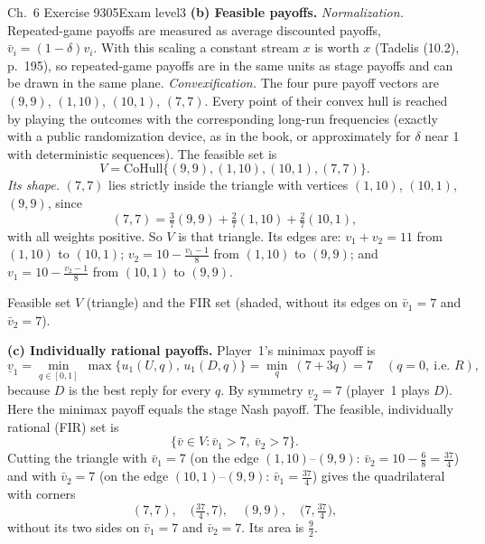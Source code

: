 \begin{exsol}{\MG{} Ch.~6 Exercise 9}{305}{Exam level}{3}
\textbf{(b) Feasible payoffs.} \emph{Normalization.} Repeated-game payoffs are measured as
average discounted payoffs, $\bar v_i = (1-\delta)v_i$. With this scaling a constant stream $x$ is
worth $x$ (Tadelis (10.2), p.~195), so repeated-game payoffs are in the same units as stage payoffs
and can be drawn in the same plane. \emph{Convexification.} The four pure payoff vectors are
$(9,9)$, $(1,10)$, $(10,1)$, $(7,7)$. Every point of their convex hull is reached by playing the
outcomes with the corresponding long-run frequencies (exactly with a public randomization device, as
in the book, or approximately for $\delta$ near 1 with deterministic sequences). The feasible set is
\[
  V = \mathrm{CoHull}\{(9,9), (1,10), (10,1), (7,7)\}.
\]
\emph{Its shape.} $(7,7)$ lies strictly inside the triangle with vertices $(1,10)$, $(10,1)$,
$(9,9)$, since
\[
  (7,7) = \tfrac37(9,9) + \tfrac27(1,10) + \tfrac27(10,1),
\]
with all weights positive. So $V$ is that triangle. Its edges are: $v_1 + v_2 = 11$ from $(1,10)$ to
$(10,1)$; $v_2 = 10 - \frac{v_1 - 1}{8}$ from $(1,10)$ to $(9,9)$; and $v_1 = 10 - \frac{v_2-1}{8}$
from $(10,1)$ to $(9,9)$.
\begin{center}
\end{center}
\vspace{-4pt}\centerline{\small Feasible set $V$ (triangle) and the FIR set (shaded, without its
edges on $\bar v_1 = 7$ and $\bar v_2 = 7$).}

\textbf{(c) Individually rational payoffs.} Player~1's minimax payoff is
\[
  \underline v_1 = \min_{q\in[0,1]}\ \max\{u_1(U,q),\, u_1(D,q)\}
  = \min_{q}\ (7 + 3q) = 7 \quad (q = 0,\ \text{i.e.\ } R),
\]
because $D$ is the best reply for every $q$. By symmetry $\underline v_2 = 7$ (player~1 plays $D$).
Here the minimax payoff equals the stage Nash payoff. The feasible, individually rational (FIR) set is
\[
  \{\bar v \in V : \bar v_1 > 7,\ \bar v_2 > 7\}.
\]
Cutting the triangle with $\bar v_1 = 7$ (on the edge $(1,10)$--$(9,9)$: $\bar v_2 = 10 - \frac68 =
\frac{37}{4}$) and with $\bar v_2 = 7$ (on the edge $(10,1)$--$(9,9)$: $\bar v_1 = \frac{37}{4}$)
gives the quadrilateral with corners
\[
  (7,7),\quad \bigl(\tfrac{37}{4}, 7\bigr),\quad (9,9),\quad \bigl(7, \tfrac{37}{4}\bigr),
\]
without its two sides on $\bar v_1 = 7$ and $\bar v_2 = 7$. Its area is $\frac92$.


\end{exsol}
